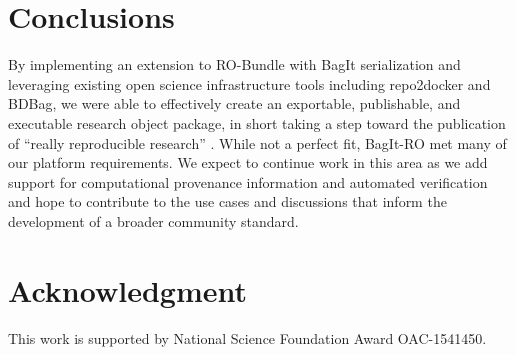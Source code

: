 \documentclass[conference]{IEEEtran}
\begin{document}
\section{Conclusions} \label{conclusion}
By implementing an extension to RO-Bundle with BagIt serialization and leveraging existing open science infrastructure tools including repo2docker and BDBag, we were able to effectively create an exportable, publishable, and executable research object package, in short taking a step toward the publication of ``really reproducible research'' \cite{claerbout1992}.  While not a perfect fit, BagIt-RO met many of our platform requirements. We expect to continue work in this area as we add support for computational provenance information and automated verification and hope to contribute to the use cases and discussions that inform the development of a broader community standard.

\section*{Acknowledgment}

This work is supported by National Science Foundation Award OAC-1541450. 




\end{document}
